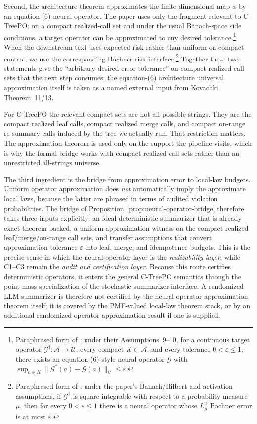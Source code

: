 Second, the architecture theorem approximates the finite-dimensional
map $\phi$ by an equation-(6) neural operator. The paper uses only the
fragment relevant to C-TreePO: on a compact realized-call set and under
the usual Banach-space side conditions, a target operator can be
approximated to any desired tolerance.\footnote{Paraphrased
form of \citet[Theorem~11]{Kovachki23NeuralOperator}: under their
Assumptions~9--10, for a continuous target operator
$\mathcal{G}^\dagger:\mathcal{A}\to\mathcal{U}$, every compact
$K\subset\mathcal{A}$, and every tolerance $0<\varepsilon\le1$, there
exists an equation-(6)-style neural operator $\mathcal{G}$ with
$\sup_{a\in K}\|\mathcal{G}^\dagger(a)-\mathcal{G}(a)\|_{\mathcal{U}}
\le \varepsilon$.} When the downstream text uses expected risk rather
than uniform-on-compact control, we use the corresponding
Bochner-risk interface.\footnote{Paraphrased form of
\citet[Theorem~13]{Kovachki23NeuralOperator}: under the paper's
Banach/Hilbert and activation assumptions, if
$\mathcal{G}^\dagger$ is square-integrable with respect to a probability
measure $\mu$, then for every $0<\varepsilon\le1$ there is a neural
operator whose $L^2_{\mu}$ Bochner error is at most $\varepsilon$.}
Together these two statements give the ``arbitrary desired error
tolerance'' on compact realized-call sets that the next step consumes;
the equation-(6) architecture universal approximation itself is taken
as a named external input from Kovachki Theorem~11/13.

For C-TreePO the relevant compact sets are not all possible strings.
They are the compact realized leaf calls, compact realized merge calls,
and compact on-range re-summary calls induced by the tree we actually
run. That restriction matters. The approximation theorem is used only on
the support the pipeline visits, which is why the formal bridge works
with compact realized-call sets rather than an unrestricted all-strings
universe.

The third ingredient is the bridge from approximation error to local-law
budgets. Uniform operator approximation does \emph{not} automatically
imply the approximate local laws, because the latter are phrased in
terms of audited violation probabilities. The bridge of
Proposition~\ref{prop:neural-operator-bridge} therefore takes three
inputs explicitly: an ideal deterministic summarizer that is already
exact theorem-backed, a uniform approximation witness on the compact
realized leaf/merge/on-range call sets, and transfer assumptions that
convert approximation tolerance $\varepsilon$ into leaf, merge, and
idempotence budgets. This is the precise sense in which the
neural-operator layer is the \emph{realizability layer}, while C1--C3
remain the \emph{audit and certification layer}.
Because this route certifies deterministic operators, it enters the
general C-TreePO semantics through the point-mass specialization of the
stochastic summarizer interface. A randomized LLM summarizer is therefore
not certified by the neural-operator approximation theorem itself; it is
covered by the PMF-valued local-law theorem stack, or by an additional
randomized-operator approximation result if one is supplied.

